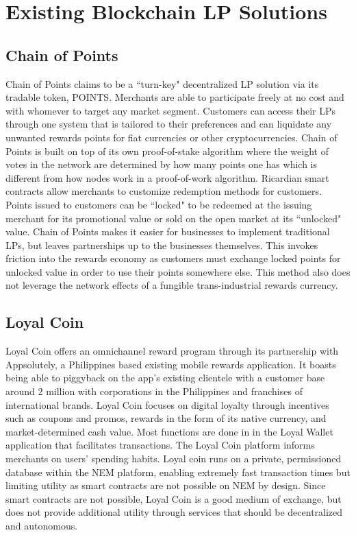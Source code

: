 \section{Existing Blockchain LP Solutions}

\subsection{Chain of Points}

Chain of Points \cite{COP17} claims to be a ``turn-key" decentralized LP solution via its tradable token, POINTS. Merchants are able to participate freely at no cost and with whomever to target any market segment. Customers can access their LPs through one system that is tailored to their preferences and can liquidate any unwanted rewards points for fiat currencies or other cryptocurrencies. Chain of Points is built on top of its own proof-of-stake algorithm where the weight of votes in the network are determined by how many points one has which is different from how nodes work in a proof-of-work algorithm. Ricardian smart contracts allow merchants to customize redemption methods for customers. Points issued to customers can be ``locked" to be redeemed at the issuing merchant for its promotional value or sold on the open market at its ``unlocked" value. Chain of Points makes it easier for businesses to implement traditional LPs, but leaves partnerships up to the businesses themselves. This invokes friction into the rewards economy as customers must exchange locked points for unlocked value in order to use their points somewhere else. This method also does not leverage the network effects of a fungible trans-industrial rewards currency.

\subsection{Loyal Coin}
Loyal Coin \cite{LYL17} offers an omnichannel reward program through its partnership with Appsolutely, a Philippines based existing mobile rewards application. It boasts being able to piggyback on the app's existing clientele with a customer base around 2 million with corporations in the Philippines and franchises of international brands. Loyal Coin focuses on digital loyalty through incentives such as coupons and promos, rewards in the form of its native currency, and market-determined cash value. Most functions are done in in the Loyal Wallet application that facilitates transactions. The Loyal Coin platform informs merchants on users' spending habits. Loyal coin runs on a private, permissioned database within the NEM platform, enabling extremely fast transaction times but limiting utility as smart contracts are not possible on NEM by design. Since smart contracts are not possible, Loyal Coin is a good medium of exchange, but does not provide additional utility through services that should be decentralized and autonomous.

